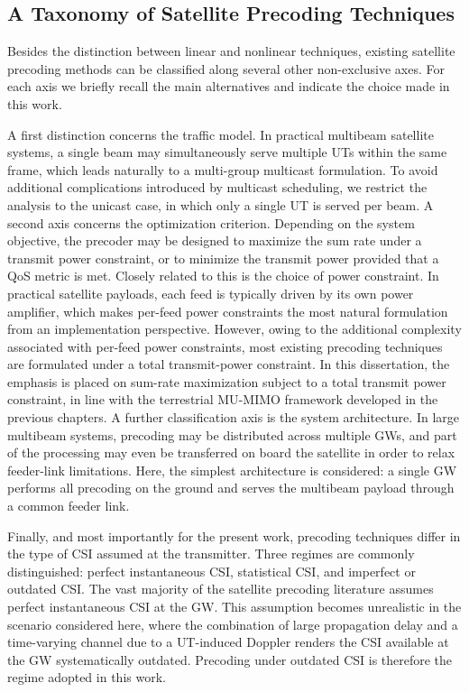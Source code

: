 \subsection{A Taxonomy of Satellite Precoding Techniques}

Besides the distinction between linear and nonlinear techniques, existing satellite precoding methods can be classified along several other non-exclusive axes. For each axis we briefly recall the main alternatives and indicate the choice made in this work.

A first distinction concerns the traffic model. In practical multibeam satellite systems, a single beam may simultaneously serve multiple \acp{UT} within the same frame, which leads naturally to a multi-group multicast formulation. 
To avoid additional complications introduced by multicast scheduling, we restrict the analysis to the unicast case, in which only a single \ac{UT} is served per beam.
A second axis concerns the optimization criterion. Depending on the system objective, the precoder may be designed to maximize the sum rate under a transmit power constraint, or to minimize the transmit power provided that a \ac{QoS} metric is met.
Closely related to this is the choice of power constraint. In practical satellite payloads, each feed is typically driven by its own power amplifier, which makes per-feed power constraints the most natural formulation from an implementation perspective.
However, owing to the additional complexity associated with per-feed power constraints, most existing precoding techniques are formulated under a total transmit-power constraint.
In this dissertation, the emphasis is placed on sum-rate maximization subject to a total transmit power constraint, in line with the terrestrial \ac{MU}-\ac{MIMO} framework developed in the previous chapters.
A further classification axis is the system architecture. 
In large multibeam systems, precoding may be distributed across multiple \acp{GW}, and part of the processing may even be transferred on board the satellite in order to relax feeder-link limitations. 
Here, the simplest architecture is considered: a single \ac{GW} performs all precoding on the ground and serves the multibeam payload through a common feeder link.

Finally, and most importantly for the present work, precoding techniques differ in the type of \ac{CSI} assumed at the transmitter. 
Three regimes are commonly distinguished: perfect instantaneous \ac{CSI}, statistical \ac{CSI}, and imperfect or outdated \ac{CSI}. 
The vast majority of the satellite precoding literature assumes perfect instantaneous \ac{CSI} at the \ac{GW}.
This assumption becomes unrealistic in the scenario considered here, where the combination of large propagation delay and a time-varying channel due to a \ac{UT}-induced Doppler renders the \ac{CSI} available at the \ac{GW} systematically outdated.
Precoding under outdated \ac{CSI} is therefore the regime adopted in this work.

